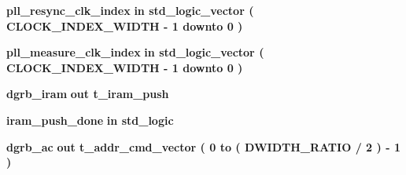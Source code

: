 \begin{DoxyCompactItemize}
\item 
{\bf pll\+\_\+resync\+\_\+clk\+\_\+index}  {\bfseries {\bfseries \textcolor{keywordflow}{in}\textcolor{vhdlchar}{ }}} {\bfseries \textcolor{comment}{std\+\_\+logic\+\_\+vector}\textcolor{vhdlchar}{ }\textcolor{vhdlchar}{(}\textcolor{vhdlchar}{ }\textcolor{vhdlchar}{ }\textcolor{vhdlchar}{ }\textcolor{vhdlchar}{ }{\bfseries {\bf C\+L\+O\+C\+K\+\_\+\+I\+N\+D\+E\+X\+\_\+\+W\+I\+D\+TH}} \textcolor{vhdlchar}{-\/}\textcolor{vhdlchar}{ } \textcolor{vhdldigit}{1} \textcolor{vhdlchar}{ }\textcolor{keywordflow}{downto}\textcolor{vhdlchar}{ }\textcolor{vhdlchar}{ } \textcolor{vhdldigit}{0} \textcolor{vhdlchar}{ }\textcolor{vhdlchar}{)}\textcolor{vhdlchar}{ }} 
\item 
{\bf pll\+\_\+measure\+\_\+clk\+\_\+index}  {\bfseries {\bfseries \textcolor{keywordflow}{in}\textcolor{vhdlchar}{ }}} {\bfseries \textcolor{comment}{std\+\_\+logic\+\_\+vector}\textcolor{vhdlchar}{ }\textcolor{vhdlchar}{(}\textcolor{vhdlchar}{ }\textcolor{vhdlchar}{ }\textcolor{vhdlchar}{ }\textcolor{vhdlchar}{ }{\bfseries {\bf C\+L\+O\+C\+K\+\_\+\+I\+N\+D\+E\+X\+\_\+\+W\+I\+D\+TH}} \textcolor{vhdlchar}{-\/}\textcolor{vhdlchar}{ } \textcolor{vhdldigit}{1} \textcolor{vhdlchar}{ }\textcolor{keywordflow}{downto}\textcolor{vhdlchar}{ }\textcolor{vhdlchar}{ } \textcolor{vhdldigit}{0} \textcolor{vhdlchar}{ }\textcolor{vhdlchar}{)}\textcolor{vhdlchar}{ }} 
\item 
{\bf dgrb\+\_\+iram}  {\bfseries {\bfseries \textcolor{keywordflow}{out}\textcolor{vhdlchar}{ }}} {\bfseries {\bfseries {\bf t\+\_\+iram\+\_\+push}} \textcolor{vhdlchar}{ }} 
\item 
{\bf iram\+\_\+push\+\_\+done}  {\bfseries {\bfseries \textcolor{keywordflow}{in}\textcolor{vhdlchar}{ }}} {\bfseries \textcolor{comment}{std\+\_\+logic}\textcolor{vhdlchar}{ }} 
\item 
{\bf dgrb\+\_\+ac}  {\bfseries {\bfseries \textcolor{keywordflow}{out}\textcolor{vhdlchar}{ }}} {\bfseries {\bfseries {\bf t\+\_\+addr\+\_\+cmd\+\_\+vector}} \textcolor{vhdlchar}{ }\textcolor{vhdlchar}{(}\textcolor{vhdlchar}{ }\textcolor{vhdlchar}{ } \textcolor{vhdldigit}{0} \textcolor{vhdlchar}{ }\textcolor{keywordflow}{to}\textcolor{vhdlchar}{ }\textcolor{vhdlchar}{(}\textcolor{vhdlchar}{ }\textcolor{vhdlchar}{ }\textcolor{vhdlchar}{ }\textcolor{vhdlchar}{ }{\bfseries {\bf D\+W\+I\+D\+T\+H\+\_\+\+R\+A\+T\+IO}} \textcolor{vhdlchar}{/}\textcolor{vhdlchar}{ } \textcolor{vhdldigit}{2} \textcolor{vhdlchar}{ }\textcolor{vhdlchar}{)}\textcolor{vhdlchar}{ }\textcolor{vhdlchar}{-\/}\textcolor{vhdlchar}{ } \textcolor{vhdldigit}{1} \textcolor{vhdlchar}{ }\textcolor{vhdlchar}{)}\textcolor{vhdlchar}{ }} 

\end{DoxyCompactItemize}
